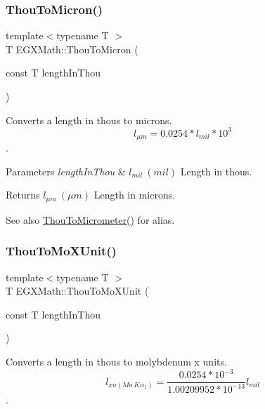 \subsubsection{\texorpdfstring{Thou\+To\+Micron()}{ThouToMicron()}}
{\footnotesize\ttfamily template$<$typename T $>$ \\
T E\+G\+X\+Math\+::\+Thou\+To\+Micron (\begin{DoxyParamCaption}\item[{const T}]{length\+In\+Thou }\end{DoxyParamCaption})}



Converts a length in thous to microns. \[ l_{\mu m}=0.0254 * l_{mil} * 10^{3} \]. 


\begin{DoxyParams}{Parameters}
{\em length\+In\+Thou} & $ l_{mil}\ (mil)$ Length in thous. \\
\hline
\end{DoxyParams}
\begin{DoxyReturn}{Returns}
$ l_{\mu m}\ (\mu m)$ Length in microns. 
\end{DoxyReturn}
\begin{DoxySeeAlso}{See also}
\mbox{\hyperlink{group___e_g_x_math-_conversions-_length_conversions-_imperial-_thou-_s_i_gaa3207ca1334f385f584132c109345a6d}{Thou\+To\+Micrometer()}} for alias. 
\end{DoxySeeAlso}
\mbox{\label{group___e_g_x_math-_conversions-_length_conversions-_imperial-_thou-_non-_s_i_ga3eb765800fa51e529878bdae4e997763}} 
\subsubsection{\texorpdfstring{Thou\+To\+Mo\+X\+Unit()}{ThouToMoXUnit()}}
{\footnotesize\ttfamily template$<$typename T $>$ \\
T E\+G\+X\+Math\+::\+Thou\+To\+Mo\+X\+Unit (\begin{DoxyParamCaption}\item[{const T}]{length\+In\+Thou }\end{DoxyParamCaption})}



Converts a length in thous to molybdenum x units. \[ l_{xu(Mo\ K\alpha_1)}=\frac{0.0254 * 10^{-3}}{1.00209952*10^{-13}} l_{mil}\]. 


